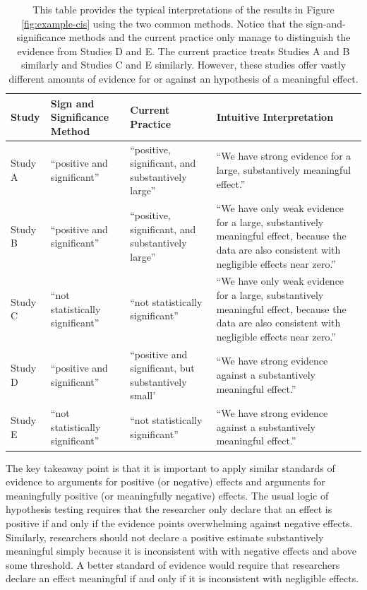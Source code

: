 \documentclass[12pt]{article}
\begin{document}
\renewcommand{\arraystretch}{1.5}
\begin{table}
\begin{center}
\begin{scriptsize}
\begin{tabular}{|>{\centering\arraybackslash}m{.5in}>{\centering\arraybackslash}m{1.75in}>{\centering\arraybackslash}m{1.75in}>{\centering\arraybackslash}
m{1.75in}|}
\hline

Study & Sign and Significance Method & Current Practice & Intuitive Interpretation\\ 
\hline
Study A & ``positive and significant'' & ``positive, significant, and substantively large'' & ``We have strong evidence for a large, substantively meaningful effect.''\\
Study B & ``positive and significant'' & ``positive, significant, and substantively large'' & ``We have only weak evidence for a large, substantively meaningful effect, because the data are also consistent with negligible effects near zero.''\\
Study C & ``not statistically significant'' & ``not statistically significant'' & ``We have only weak evidence for a large, substantively meaningful effect, because the data are also consistent with negligible effects near zero.''\\
Study D & ``positive and significant'' & ``positive and significant, but substantively small' & ``We have strong evidence against a substantively meaningful effect.''\\
Study E & ``not statistically significant'' & ``not statistically significant'' & ``We have strong evidence against a substantively meaningful effect.''\\
\hline
\end{tabular}\caption{This table provides the typical interpretations of the results in Figure \ref{fig:example-cis} using the two common methods. Notice that the sign-and-significance methods and the current practice only manage to distinguish the evidence from Studies D and E. The current practice treats Studies A and B similarly and Studies C and E similarly. However, these studies offer vastly different amounts of evidence for or against an hypothesis of a meaningful effect.}\label{tab:example-cis}
\end{scriptsize}
\end{center}
\end{table}

The key takeaway point is that it is important to apply similar standards of evidence to arguments for positive (or negative) effects and arguments for meaningfully positive (or meaningfully negative) effects. The usual logic of hypothesis testing requires that the researcher only declare that an effect is positive if and only if the evidence points overwhelming against negative effects. Similarly, researchers should not declare a positive estimate substantively meaningful simply because it is inconsistent with with negative effects and above some threshold. A better standard of evidence would require that researchers declare an effect meaningful if and only if it is inconsistent with negligible effects.
\end{document}
